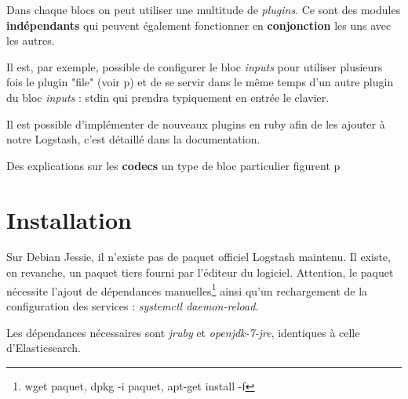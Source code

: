 Dans chaque blocs on peut utiliser une multitude de \textit{plugins}. Ce sont des modules 
\textbf{indépendants} qui peuvent également fonctionner en \textbf{conjonction} les 
uns avec les autres.

Il est, par exemple, possible de configurer le bloc \emph{inputs} pour utiliser 
plusieurs fois le plugin "file" (voir p\pageref{lst:conflogstashsyntaxe1}) 
et de se servir dans le même temps d'un autre plugin du bloc \emph{inputs} : stdin 
qui prendra typiquement en entrée le clavier.


Il est possible d'implémenter de nouveaux plugins en ruby afin de les ajouter à
notre Logstash, c'est détaillé dans la documentation. 

Des explications sur les \textbf{codecs} un type de bloc particulier figurent p\pageref{subsec:logstashcodec}



\section{Installation}
%
%
%
%
%
%
%
%
%




Sur Debian Jessie, il n'existe pas de paquet officiel Logstash maintenu. Il existe,
en revanche, un paquet tiers
fourni par l'éditeur du logiciel. Attention, le paquet nécessite l'ajout de dépendances manuelles\footnote{wget paquet, 
dpkg -i paquet, apt-get install -f} ainsi qu'un rechargement de 
la configuration des services : \emph{systemctl daemon-reload}.

Les dépendances nécessaires sont \emph{jruby} et \emph{openjdk-7-jre}, identiques 
à celle d'Elasticsearch.


